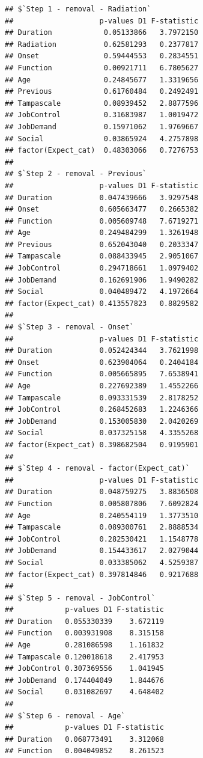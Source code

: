 \documentclass[
]{book}
\begin{document}
\begin{verbatim}
## $`Step 1 - removal - Radiation`
##                    p-values D1 F-statistic
## Duration            0.05133866   3.7972150
## Radiation           0.62581293   0.2377817
## Onset               0.59444553   0.2834551
## Function            0.00921711   6.7805627
## Age                 0.24845677   1.3319656
## Previous            0.61760484   0.2492491
## Tampascale          0.08939452   2.8877596
## JobControl          0.31683987   1.0019472
## JobDemand           0.15971062   1.9769667
## Social              0.03865924   4.2757898
## factor(Expect_cat)  0.48303066   0.7276753
## 
## $`Step 2 - removal - Previous`
##                    p-values D1 F-statistic
## Duration           0.047439666   3.9297548
## Onset              0.605663477   0.2665382
## Function           0.005609748   7.6719271
## Age                0.249484299   1.3261948
## Previous           0.652043040   0.2033347
## Tampascale         0.088433945   2.9051067
## JobControl         0.294718661   1.0979402
## JobDemand          0.162691906   1.9490282
## Social             0.040489472   4.1972664
## factor(Expect_cat) 0.413557823   0.8829582
## 
## $`Step 3 - removal - Onset`
##                    p-values D1 F-statistic
## Duration           0.052424344   3.7621998
## Onset              0.623904064   0.2404184
## Function           0.005665895   7.6538941
## Age                0.227692389   1.4552266
## Tampascale         0.093331539   2.8178252
## JobControl         0.268452683   1.2246366
## JobDemand          0.153005830   2.0420269
## Social             0.037325158   4.3355268
## factor(Expect_cat) 0.398682504   0.9195901
## 
## $`Step 4 - removal - factor(Expect_cat)`
##                    p-values D1 F-statistic
## Duration           0.048759275   3.8836508
## Function           0.005807806   7.6092824
## Age                0.240554119   1.3773510
## Tampascale         0.089300761   2.8888534
## JobControl         0.282530421   1.1548778
## JobDemand          0.154433617   2.0279044
## Social             0.033385062   4.5259387
## factor(Expect_cat) 0.397814846   0.9217688
## 
## $`Step 5 - removal - JobControl`
##            p-values D1 F-statistic
## Duration   0.055330339    3.672119
## Function   0.003931908    8.315158
## Age        0.281086598    1.161832
## Tampascale 0.120018618    2.417953
## JobControl 0.307369556    1.041945
## JobDemand  0.174404049    1.844676
## Social     0.031082697    4.648402
## 
## $`Step 6 - removal - Age`
##            p-values D1 F-statistic
## Duration   0.068773491    3.312068
## Function   0.004049852    8.261523

\end{verbatim}
\end{document}
